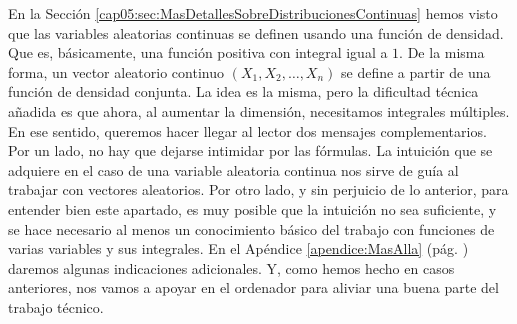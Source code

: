 En la Sección \ref{cap05:sec:MasDetallesSobreDistribucionesContinuas} hemos visto que las variables aleatorias continuas se definen usando una función de densidad. Que es, básicamente, una función positiva con integral igual a $1$. De la misma forma, un vector aleatorio continuo $(X_1,X_2,\ldots, X_n)$ se define a partir de una función de densidad conjunta. La idea es la misma, pero la dificultad técnica añadida es que ahora, al aumentar la dimensión, necesitamos integrales múltiples. En ese sentido, queremos hacer llegar al lector dos mensajes complementarios. Por un lado, no hay que dejarse intimidar por las fórmulas. La intuición que se adquiere en el caso de una variable aleatoria continua nos sirve de guía al trabajar con vectores aleatorios. Por otro lado, y sin perjuicio de lo anterior, para entender bien este apartado, es muy posible que la intuición no sea suficiente, y se hace necesario al menos un conocimiento básico del trabajo con funciones de varias variables y sus integrales. En el Apéndice \ref{apendice:MasAlla} (pág. \pageref{apendice:MasAlla}) daremos algunas indicaciones adicionales. Y, como hemos hecho en casos anteriores, nos vamos a apoyar en el ordenador para aliviar una buena parte del trabajo técnico.
